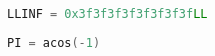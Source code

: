 \begin{lstlisting}[language=C++]
LLINF = 0x3f3f3f3f3f3f3f3fLL
\end{lstlisting}

\begin{lstlisting}[language=C++]
PI = acos(-1)
\end{lstlisting}

